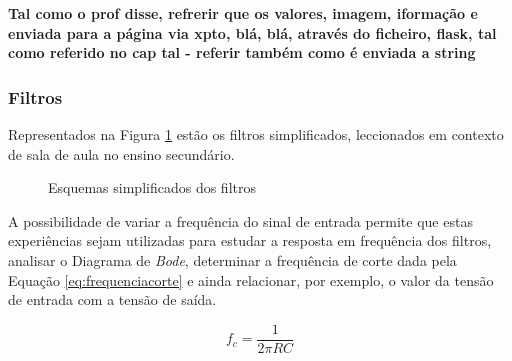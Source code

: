 \textbf{Tal como o prof disse, refrerir que os valores, imagem, iformação e enviada para a página via xpto, blá, blá, através do ficheiro, flask, tal como referido no cap tal - referir também como é enviada a string}

\subsubsection{Filtros}
\label{sec:filtros}
Representados na Figura \ref{fig:filtrosesqgeral} estão os filtros simplificados, leccionados em contexto de sala de aula no ensino secundário.

\begin{figure}[hbtp]
	\centering%
		\centering
		\qquad
		\caption{Esquemas simplificados dos filtros \cite{sedrasmith}}%
		\label{fig:filtrosesqgeral}%
	\end{figure}

A possibilidade de variar a frequência do sinal de entrada permite que estas experiências sejam utilizadas para estudar a resposta em frequência dos filtros, analisar o Diagrama de \textit{Bode}, determinar a frequência de corte dada pela Equação \ref{eq:frequenciacorte} e ainda relacionar, por exemplo, o valor da tensão de entrada com a tensão de saída. 

\begin{equation} \label{eq:frequenciacorte}
	f_{c} = \frac{1}{2\pi RC}
\end{equation}

